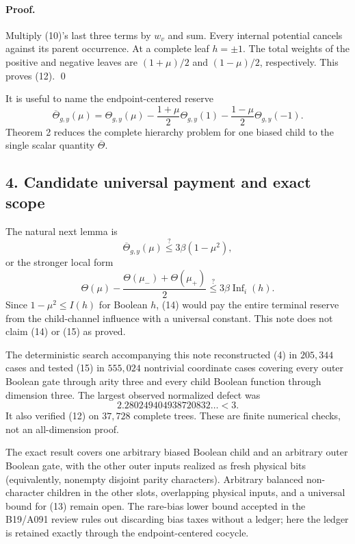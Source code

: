 \paragraph{Proof.}
Multiply (10)'s last three terms by $w_v$ and sum.  Every internal potential
cancels against its parent occurrence.  At a complete leaf $h=\pm1$.  The
total weights of the positive and negative leaves are $(1+\mu)/2$ and
$(1-\mu)/2$, respectively.  This proves (12). \qed

It is useful to name the endpoint-centered reserve
\[
 \overline\Theta_{g,y}(\mu)=\Theta_{g,y}(\mu)
  -\frac{1+\mu}{2}\Theta_{g,y}(1)
  -\frac{1-\mu}{2}\Theta_{g,y}(-1).                            \tag{13}
\]
Theorem 2 reduces the complete hierarchy problem for one biased child to the
single scalar quantity $\overline\Theta$.

\subsection*{4. Candidate universal payment and exact scope}

The natural next lemma is
\[
 \overline\Theta_{g,y}(\mu)
 \stackrel{?}{\le}3\beta(1-\mu^2),                              \tag{14}
\]
or the stronger local form
\[
 \Theta(\mu)-\frac{\Theta(\mu_-)+\Theta(\mu_+)}2
 \stackrel{?}{\le}3\beta\operatorname{Inf}_i(h).               \tag{15}
\]
Since $1-\mu^2\le I(h)$ for Boolean $h$, (14) would pay the entire terminal
reserve from the child-channel influence with a universal constant.  This
note does not claim (14) or (15) as proved.

The deterministic search accompanying this note reconstructed (4) in
$205{,}344$ cases and tested (15) in $555{,}024$ nontrivial coordinate cases
covering every outer Boolean gate through arity three and every child Boolean
function through dimension three.  The largest observed normalized defect was
\[
 2.280249404938720832\ldots<3.
\]
It also verified (12) on $37{,}728$ complete trees.  These are finite numerical
checks, not an all-dimension proof.

The exact result covers one arbitrary biased Boolean child and an arbitrary
outer Boolean gate, with the other outer inputs realized as fresh physical
bits (equivalently, nonempty disjoint parity characters).  Arbitrary balanced
non-character children in the other slots, overlapping physical inputs, and
a universal bound for (13) remain open.  The rare-bias lower bound accepted in
the B19/A091 review rules out discarding bias taxes without a ledger; here the
ledger is retained exactly through the endpoint-centered cocycle.
